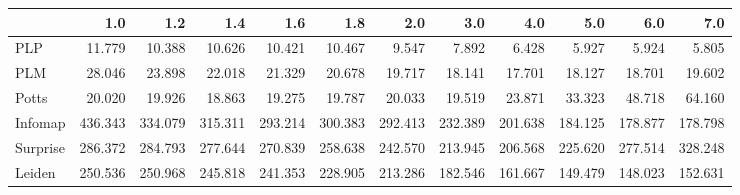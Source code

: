 \begin{tabular}{lrrrrrrrrrrr}
\toprule
{} &     1.0 &     1.2 &     1.4 &     1.6 &     1.8 &     2.0 &     3.0 &     4.0 &     5.0 &     6.0 &     7.0 \\
\midrule
PLP      &  11.779 &  10.388 &  10.626 &  10.421 &  10.467 &   9.547 &   7.892 &   6.428 &   5.927 &   5.924 &   5.805 \\
PLM      &  28.046 &  23.898 &  22.018 &  21.329 &  20.678 &  19.717 &  18.141 &  17.701 &  18.127 &  18.701 &  19.602 \\
Potts    &  20.020 &  19.926 &  18.863 &  19.275 &  19.787 &  20.033 &  19.519 &  23.871 &  33.323 &  48.718 &  64.160 \\
Infomap  & 436.343 & 334.079 & 315.311 & 293.214 & 300.383 & 292.413 & 232.389 & 201.638 & 184.125 & 178.877 & 178.798 \\
Surprise & 286.372 & 284.793 & 277.644 & 270.839 & 258.638 & 242.570 & 213.945 & 206.568 & 225.620 & 277.514 & 328.248 \\
Leiden   & 250.536 & 250.968 & 245.818 & 241.353 & 228.905 & 213.286 & 182.546 & 161.667 & 149.479 & 148.023 & 152.631 \\
\bottomrule
\end{tabular}
